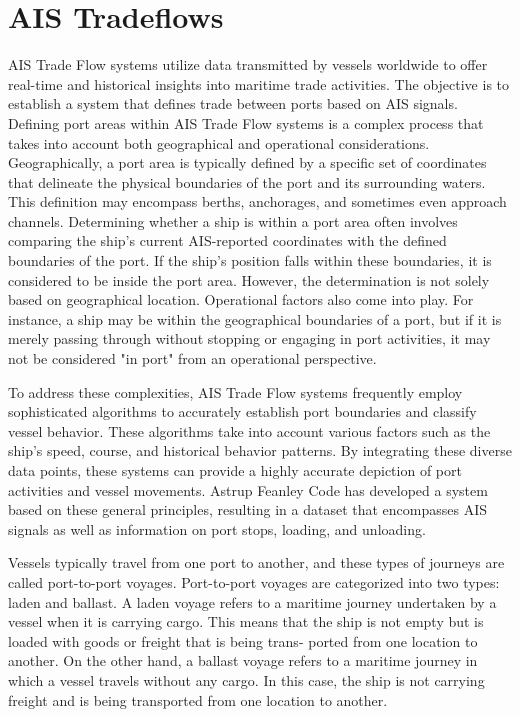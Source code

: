 \section{AIS Tradeflows}

AIS Trade Flow systems utilize data transmitted by vessels worldwide to offer real-time and historical insights into maritime trade activities.
The objective is to establish a system that defines trade between ports based on AIS signals.
Defining port areas within AIS Trade Flow systems is a complex process that takes into account both geographical and operational considerations.
Geographically, a port area is typically defined by a specific set of coordinates that delineate the physical boundaries of the port and its surrounding waters.
This definition may encompass berths, anchorages, and sometimes even approach channels. Determining whether a ship is within a port area often involves comparing the ship's current AIS-reported coordinates with the defined boundaries of the port.
If the ship's position falls within these boundaries, it is considered to be inside the port area. However, the determination is not solely based on geographical location.
Operational factors also come into play.
For instance, a ship may be within the geographical boundaries of a port, but if it is merely passing through without stopping or engaging in port activities, it may not be considered "in port" from an operational perspective.

To address these complexities, AIS Trade Flow systems frequently employ sophisticated algorithms to accurately establish port boundaries and classify vessel behavior.
These algorithms take into account various factors such as the ship's speed, course, and historical behavior patterns.
By integrating these diverse data points, these systems can provide a highly accurate depiction of port activities and vessel movements.
Astrup Feanley Code has developed a system based on these general principles, resulting in a dataset that encompasses AIS signals as well as information on port stops, loading, and unloading.


Vessels typically travel from one port to another, and these types of journeys are called port-to-port voyages.
Port-to-port voyages are categorized into two types: laden and ballast.
A laden voyage refers to a maritime journey undertaken by a vessel when it is carrying cargo.
This means that the ship is not empty but is loaded with goods or freight that is being trans- ported from one location to another.
On the other hand, a ballast voyage refers to a maritime journey in which a vessel travels without any cargo.
In this case, the ship is not carrying freight and is being transported from one location to another.

